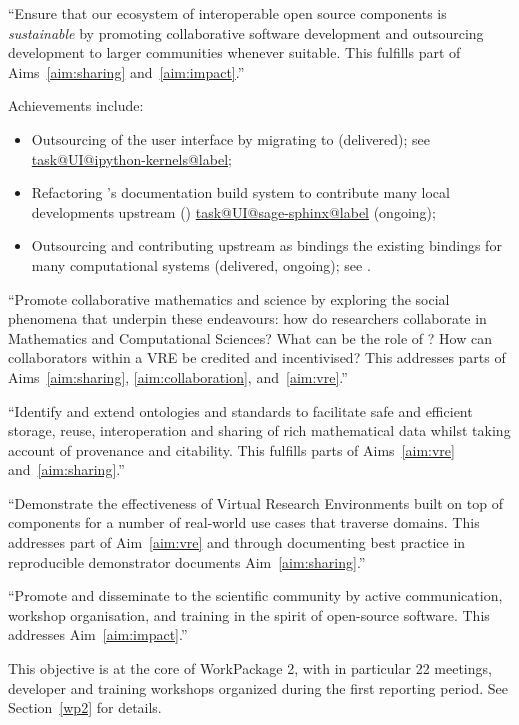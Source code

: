 \documentclass{deliverablereport}
\makeatletter
\newcommand\localtaskref[2]{\hyperref[#1@#2]{\csname task@#1@#2@label\endcsname}}
\makeatother
\begin{document}
\begin{compactenum}
\item \label{objective:sustainable} ``Ensure that our ecosystem of
  interoperable open source components is \emph{sustainable} by
  promoting collaborative software development and outsourcing
  development to larger communities whenever suitable. This fulfills
  part of Aims~\ref{aim:sharing} and~\ref{aim:impact}.''

  Achievements include:
  \begin{itemize}
  \item Outsourcing of the \Sage user interface by migrating to
    \Jupyter (delivered); see \localtaskref{UI}{ipython-kernels};
  \item Refactoring \Sage's documentation build system to contribute
    many local developments upstream (\Sphinx)
    \localtaskref{UI}{sage-sphinx} (ongoing);
  \item Outsourcing and contributing upstream as \Python bindings the
    existing \Sage bindings for many computational systems (delivered,
    ongoing); see .
  \end{itemize}

\item \label{objective:social} ``Promote collaborative mathematics and
  science by exploring the social phenomena that underpin these
  endeavours: how do researchers collaborate in Mathematics and
  Computational Sciences?  What can be the role of \VREs?  How can
  collaborators within a VRE be credited and incentivised? This
  addresses parts of Aims~\ref{aim:sharing}, \ref{aim:collaboration},
  and~\ref{aim:vre}.''


\item \label{objective:data} ``Identify and extend ontologies and
  standards to facilitate safe and efficient storage, reuse,
  interoperation and sharing of rich mathematical data whilst taking
  account of provenance and citability. This fulfills parts of
  Aims~\ref{aim:vre} and~\ref{aim:sharing}.''

\item \label{objective:demo} ``Demonstrate the effectiveness of Virtual
  Research Environments built on top of \ODK components for a
  number of real-world use cases that traverse domains. This addresses
  part of Aim~\ref{aim:vre} and through documenting best practice in
  reproducible demonstrator documents Aim~\ref{aim:sharing}.''

\item \label{objective:disseminate} ``Promote and disseminate
  \ODK to the scientific community by active communication,
  workshop organisation, and training in the spirit of open-source
  software. This addresses Aim~\ref{aim:impact}.''

  This objective is at the core of WorkPackage 2, with in particular
  22 meetings, developer and training workshops organized during the
  first reporting period. See Section~\ref{wp2} for details.
\end{compactenum}
\end{document}
